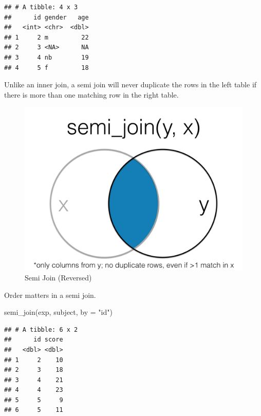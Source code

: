 \documentclass[
  oneside]{book}
\newenvironment{Shaded}{\begin{snugshade}}{\end{snugshade}}
\newcommand{\AttributeTok}[1]{\textcolor[rgb]{0.77,0.63,0.00}{#1}}
\newcommand{\FunctionTok}[1]{\textcolor[rgb]{0.00,0.00,0.00}{#1}}
\newcommand{\NormalTok}[1]{#1}
\newcommand{\StringTok}[1]{\textcolor[rgb]{0.31,0.60,0.02}{#1}}
\begin{document}
\begin{verbatim}
## # A tibble: 4 x 3
##      id gender   age
##   <int> <chr>  <dbl>
## 1     2 m         22
## 2     3 <NA>      NA
## 3     4 nb        19
## 4     5 f         18
\end{verbatim}

\begin{info}
Unlike an inner join, a semi join will never duplicate the rows in the left table if there is more than one matching row in the right table.

\end{info}

\begin{figure}

{\centering \includegraphics[width=1\linewidth]{images/joins/semi_join_rev} 

}

\caption{Semi Join (Reversed)}\label{fig:img-semi-join-rev}
\end{figure}

Order matters in a semi join.

\begin{Shaded}
\begin{Highlighting}[]
\FunctionTok{semi\_join}\NormalTok{(exp, subject, }\AttributeTok{by =} \StringTok{"id"}\NormalTok{)}
\end{Highlighting}
\end{Shaded}

\begin{verbatim}
## # A tibble: 6 x 2
##      id score
##   <dbl> <dbl>
## 1     2    10
## 2     3    18
## 3     4    21
## 4     4    23
## 5     5     9
## 6     5    11
\end{verbatim}
\end{document}
